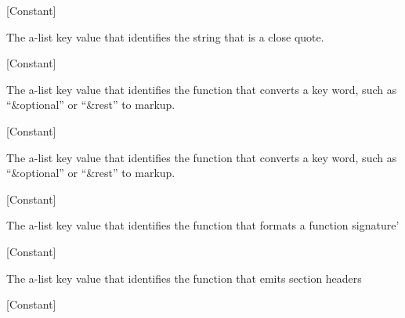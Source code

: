 \vspace{1em}
\noindent
{}
\usebox{\funcname}
 \hfill [Constant]

\begin{doc-string}
The a-list key value that identifies the string that is a close quote.
\end{doc-string}

\vspace{1em}
\noindent
{}
\usebox{\funcname}
 \hfill [Constant]

\begin{doc-string}
The a-list key value that identifies the function that converts a key word, such
as ``\&optional'' or ``\&rest'' to markup.
\end{doc-string}

\vspace{1em}
\noindent
{}
\usebox{\funcname}
 \hfill [Constant]

\begin{doc-string}
The a-list key value that identifies the function that converts a key word, such
as ``\&optional'' or ``\&rest'' to markup.
\end{doc-string}

\vspace{1em}
\noindent
{}
\usebox{\funcname}
 \hfill [Constant]

\begin{doc-string}
The a-list key value that identifies the function that formats a function signature'
\end{doc-string}

\vspace{1em}
\noindent
{}
\usebox{\funcname}
 \hfill [Constant]

\begin{doc-string}
The a-list key value that identifies the function that emits section headers
\end{doc-string}

\vspace{1em}
\noindent
{}
\usebox{\funcname}
 \hfill [Constant]

